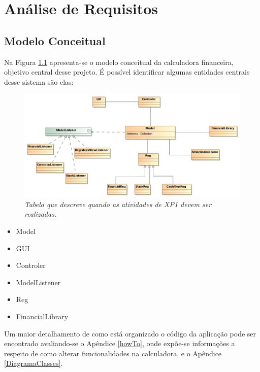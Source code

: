 \chapter{Análise de Requisitos}

\section{Modelo Conceitual}


Na Figura \ref{tab:modeConc} apresenta-se o modelo conceitual da calculadora financeira, objetivo central desse projeto. É possível identificar algumas entidades centrais desse sistema são elas:

\begin{figure}[!h]
 \includegraphics[scale=0.5]{CalcDC.eps}
 \caption{\it Tabela que descreve quando as atividades de XP1 devem ser realizadas.} \label{tab:modeConc}
\end{figure}

\begin{itemize}
	\item Model
	\item GUI
	\item Controler
	\item ModelListener
	\item Reg
	\item FinancialLibrary
\end{itemize}

Um maior detalhamento de como está organizado o código da aplicação pode ser encontrado avaliando-se o Apêndice \ref{howTo}, onde expõe-se informações a respeito de como alterar funcionalidades na calculadora, e o Apêndice \ref{DiagramaClasses}.

